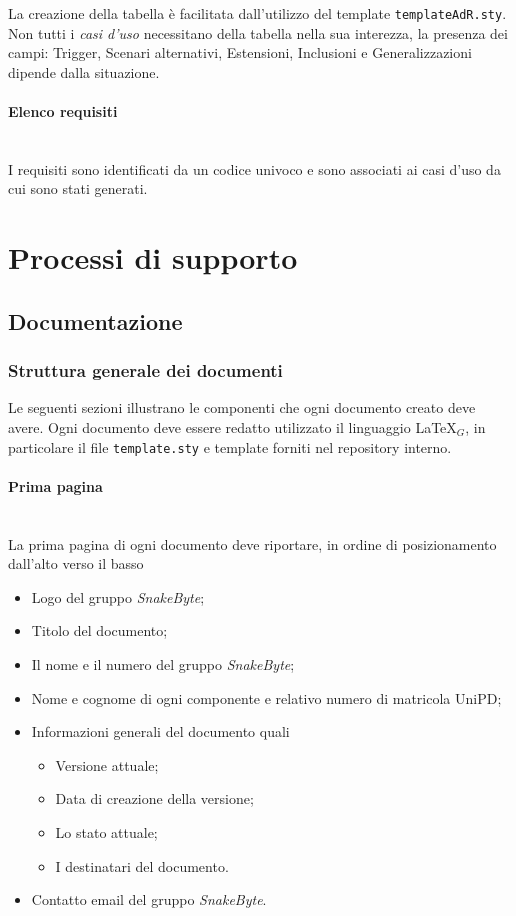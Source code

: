 \documentclass[10pt, letterpaper]{article}
\newcommand{\trisubsection}[1]{\paragraph{#1}\mbox{}\\}
\begin{document}
La creazione della tabella è facilitata dall'utilizzo del template \texttt{templateAdR.sty}.\\
Non tutti i \textit{casi d'uso} necessitano della tabella nella sua interezza, la presenza dei campi: Trigger, Scenari alternativi, Estensioni, Inclusioni e Generalizzazioni
dipende dalla situazione.



\trisubsection{{Elenco requisiti}}
I requisiti sono identificati da un codice univoco e sono associati ai casi d'uso da cui sono stati generati.

\section{Processi di supporto}
\subsection{Documentazione}
\subsubsection{Struttura generale dei documenti}
\label{sec:Struttura}
Le seguenti sezioni illustrano le componenti che ogni documento creato deve avere. Ogni documento deve essere redatto utilizzato il linguaggio \LaTeX$_{G}$, in particolare il file \texttt{template.sty} e template forniti nel repository interno.

\trisubsection{Prima pagina}
La prima pagina di ogni documento deve riportare, in ordine di posizionamento dall'alto verso il basso

\begin{itemize}
    \item Logo del gruppo \textit{SnakeByte};
    \item Titolo del documento;
    \item Il nome e il numero del gruppo \textit{SnakeByte};
    \item Nome e cognome di ogni componente e relativo numero di matricola UniPD;
    \item Informazioni generali del documento quali
          \begin{itemize}
              \item Versione attuale;
              \item Data di creazione della versione;
              \item Lo stato attuale;
              \item I destinatari del documento.
          \end{itemize}
    \item Contatto email del gruppo \textit{SnakeByte}.
\end{itemize}
\end{document}
